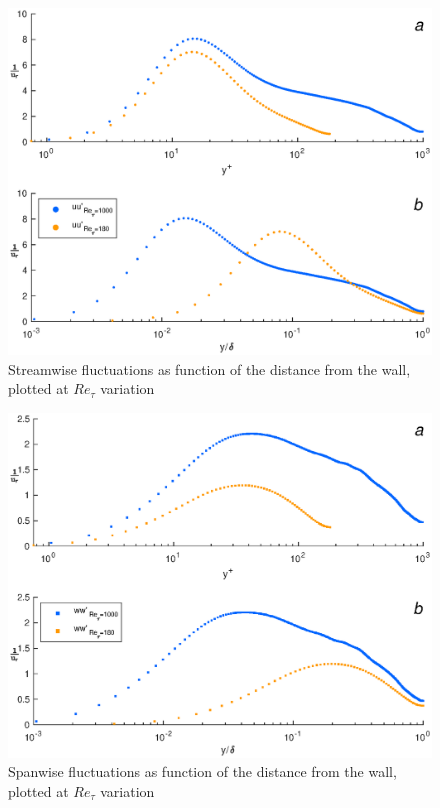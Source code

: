 \begin{figure}
\begin{center}
\includegraphics[scale=0.55]{grafici/uu_comparison.eps}
\caption{Streamwise fluctuations as function of the distance from the wall, plotted at $Re_{\tau}$ variation}
\label{uu:comparison}
\end{center}
\end{figure}
\begin{figure}
\begin{center}
\includegraphics[scale=0.55]{grafici/ww_comparison.eps}
\caption{Spanwise fluctuations as function of the distance from the wall, plotted at $Re_{\tau}$ variation}
\label{ww:comparison}
\end{center}
\end{figure}

